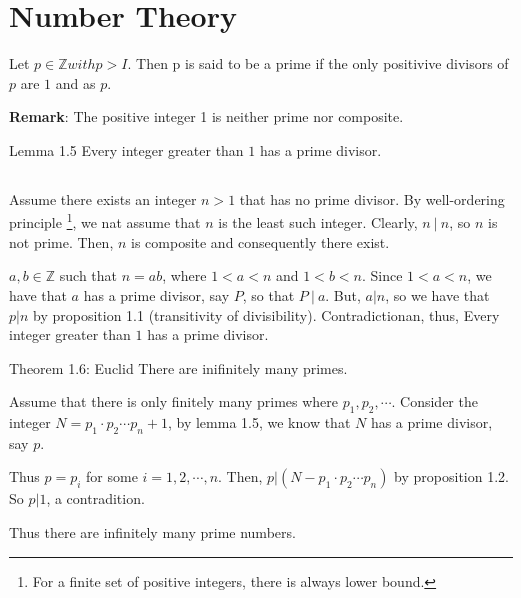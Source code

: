 



\section{Number Theory}
\begin{state}{ }
    Let $p \in \mathbb{Z} with p > I.$ Then p is said to be a prime if the 
    only positivive divisors of $p$ are $1$ and as $p$.

    \textbf{Remark}: The positive integer 1 is neither prime nor composite.

\end{state}

\begin{state}{Lemma 1.5}
    Every integer greater than $1$ has a prime divisor.
\end{state}
\subsection{}
\begin{subprove}
    Assume there exists an integer $n>1$ that has no prime divisor.
    By well-ordering principle \footnote{For a finite set of positive integers, there is always lower bound.}, we nat assume that $n$ is the least such integer.
    Clearly, $n~|~n$, so $n$ is not prime. Then, $n$ is composite and consequently there exist.
\end{subprove}

$a,b\in \mathbb{Z}$ such that $n=ab$, where $1<a<n$ and $1<b<n$. Since $1<a<n$, we have that $a$ has a 
prime divisor, say $P$, so that $P~|~a$. But, $a|n$, so we have that $p|n$ by proposition 1.1 
(transitivity of divisibility). Contradictionan, thus, Every integer greater than $1$ has a prime divisor.





\begin{state}{Theorem 1.6: Euclid}
    There are inifinitely many primes.
\end{state}
\begin{subprove}
    Assume that there is only finitely many primes where ${p_1,p_2, \cdots}$.
    Consider the integer $N=p_1\cdot p_2 \cdots p_n +1$, by lemma 1.5, we 
    know that $N$ has a prime divisor, say $p$.

    Thus $p=p_i$ for some $i=1,2,\cdots,n$. Then, $p|(N-p_1\cdot p_2\cdots p_n)$ by 
    proposition 1.2. So $p|1$, a contradition.

    Thus there are infinitely many prime numbers.

\end{subprove}

